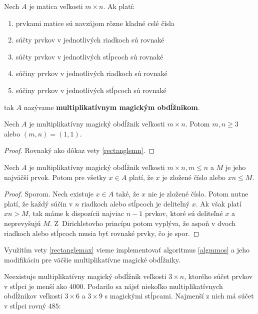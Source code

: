 \begin{definition} Nech $A$ je matica veľkosti $m \times n$. Ak platí:

\begin{enumerate}
\item prvkami matice sú navzájom rôzne kladné celé čísla
\item súčty prvkov v jednotlivých riadkoch sú rovnaké
\item súčty prvkov v jednotlivých stĺpcoch sú rovnaké
\item súčiny prvkov v jednotlivých riadkoch sú rovnaké
\item súčiny prvkov v jednotlivých stĺpcoch sú rovnaké
\end{enumerate}

tak $A$ nazývame \textbf{multiplikatívnym magickým obdĺžnikom}.
\end{definition} 

\begin{theorem} Nech $A$ je multiplikatívny magický obdĺžnik veľkosti $m \times n$. Potom $m,n \geq 3$ alebo $(m, n) = (1, 1)$.
\end{theorem}

\begin{proof} Rovnaký ako dôkaz vety \ref{rectanglemn}.
\end{proof}

\begin{theorem}
\label{rectanglemax}
Nech $A$ je multiplikatívny magický obdĺžnik veľkosti $m \times n, m \leq n$ a $M$ je jeho najväčší prvok. Potom pre všetky $x \in A$ platí, že $x$ je zložené číslo alebo $xn \leq M$.
\end{theorem}

\begin{proof} Sporom. Nech existuje $x \in A$ také, že $x$ nie je zložené číslo. Potom nutne platí, že každý súčin v $n$ riadkoch alebo stĺpcoch je deliteľný $x$. Ak však platí $xn > M$, tak máme k dispozícii najviac $n-1$ prvkov, ktoré sú deliteľné $x$ a neprevyšujú $M$. Z~Dirichletovho princípu potom vyplýva, že aspoň v dvoch riadkoch alebo stĺpcoch musia byť rovnaké prvky, čo je spor.
\end{proof}

Využitím vety \ref{rectanglemax} vieme implementovať algoritmus \ref{algmmos} a jeho modifikáciu pre väčšie multiplikatívne magické obdĺžniky. 

\begin{result} Neexistuje multiplikatívny magický obdĺžnik veľkosti $3 \times n$, ktorého súčet prvkov v stĺpci je menší ako $4000$. Podarilo sa nájsť niekoľko multiplikatívnych obdĺžnikov veľkosti $3 \times 6$ a $3 \times 9$ s magickými stĺpcami. Najmenší z nich má súčet v stĺpci rovný $485$:
\end{result}

